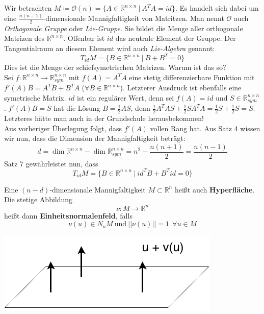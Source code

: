 \begin{beispiel}
Wir betrachten $M\coloneqq\mathcal{O}(n)=\{A\in\mathbb{R}^{n\times n}\ |\ A^TA=id \}$. 
Es handelt sich dabei um eine $\frac{n(n-1)}{2}$-dimensionale Mannigfaltigkeit von Matritzen. 
Man nennt $\mathcal{O}$ auch \emph{Orthogonale Gruppe} oder \emph{Lie-Gruppe}. 
Sie bildet die Menge aller orthogonale Matrizen des $\mathbb{R}^{n\times n}$. 
Offenbar ist $id$ das neutrale Element der Gruppe. Der Tangentialraum an diesem Element wird auch \emph{Lie-Algebra} genannt:
\begin{equation*}
T_{id}M=\{B\in\mathbb{R}^{n\times n}\ |\ B+B^T=0\}
\end{equation*}
Dies ist die Menge der schiefsymetrischen Matrizen. Warum ist das so?\\
\linebreak
Sei $f:\mathbb{R}^{n\times n}\rightarrow\mathbb{R}_{sym}^{n\times n}$ mit $f(A)=A^TA$ eine stetig differenzierbare Funktion mit $f'(A)B=A^TB+B^TA$ ($\forall B\in\mathbb{R}^{n\times n}$). Letzterer Ausdruck ist ebenfalls eine symetrische Matrix. 
$id$ ist ein regulärer Wert, denn sei $f(A)=id$ und $S\in\mathbb{R}_{sym}^{n\times n}$. $f'(A)B=S$ hat die Lösung $B=\frac{1}{2}AS$, denn $\frac{1}{2}A^TAS+\frac{1}{2}SA^TA=\frac{1}{2}S+\frac{1}{2}S=S$.
Letzteres hätte man auch in der Grundschule herausbekommen!\\
Aus vorheriger Überlegung folgt, dass $f'(A)$ vollen Rang hat. Aus Satz 4 wissen wir nun, dass die Dimension der Mannigfaltigkeit beträgt:
\begin{equation*}
d=\dim\mathbb{R}^{n\times n}-\dim\mathbb{R}_{sym}^{n\times n}=n^2-\frac{n(n+1)}{2}=\frac{n(n-1)}{2}
\end{equation*}
Satz 7 gewährleistet nun, dass
\begin{equation*}
T_{id}M=\{B\in\mathbb{R}^{n\times n} \ | \ id^TB+B^Tid=0\}
\end{equation*}
\end{beispiel}

\begin{definition}
Eine $(n-d)$-dimensionale Mannigfaltigkeit $M\subset\mathbb{R}^n$ heißt auch \textbf{Hyperfläche}. Die stetige Abbildung
\begin{equation*}
\nu:M\rightarrow\mathbb{R}^{n}
\end{equation*} 
heißt dann \textbf{Einheitsnormalenfeld}, falls 
\begin{equation*}
\nu(u)\in N_uM\ \mathrm{und\ } ||\nu(u)||=1 \ \ \forall u\in M
\end{equation*}
\begin{center}
	\includegraphics[scale=0.5]{pictures/003-02.png}
\end{center}
\end{definition}

